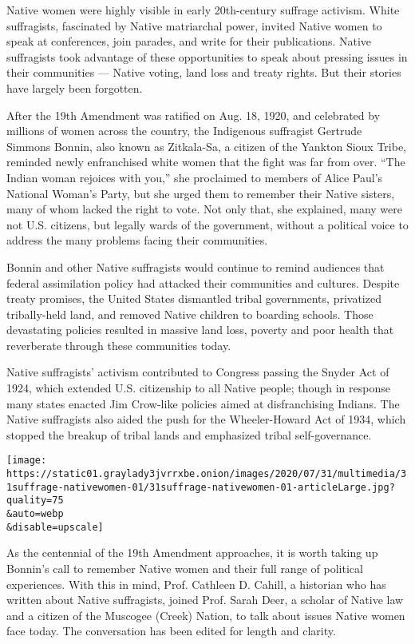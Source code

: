 Native women were highly visible in early 20th-century suffrage
activism. White suffragists, fascinated by Native matriarchal power,
invited Native women to speak at conferences, join parades, and write
for their publications. Native suffragists took advantage of these
opportunities to speak about pressing issues in their communities ---
Native voting, land loss and treaty rights. But their stories have
largely been forgotten.

After the 19th Amendment was ratified on Aug. 18, 1920, and celebrated
by millions of women across the country, the Indigenous suffragist
Gertrude Simmons Bonnin, also known as Zitkala-Sa, a citizen of the
Yankton Sioux Tribe, reminded newly enfranchised white women that the
fight was far from over. ``The Indian woman rejoices with you,'' she
proclaimed to members of Alice Paul's National Woman's Party, but she
urged them to remember their Native sisters, many of whom lacked the
right to vote. Not only that, she explained, many were not U.S.
citizens, but legally wards of the government, without a political voice
to address the many problems facing their communities.

Bonnin and other Native suffragists would continue to remind audiences
that federal assimilation policy had attacked their communities and
cultures. Despite treaty promises, the United States dismantled tribal
governments, privatized tribally-held land, and removed Native children
to boarding schools. Those devastating policies resulted in massive land
loss, poverty and poor health that reverberate through these communities
today.

Native suffragists' activism contributed to Congress passing the Snyder
Act of 1924, which extended U.S. citizenship to all Native people;
though in response many states enacted Jim Crow-like policies aimed at
disfranchising Indians. The Native suffragists also aided the push for
the Wheeler-Howard Act of 1934, which stopped the breakup of tribal
lands and emphasized tribal self-governance.

\texttt{[image: https://static01.graylady3jvrrxbe.onion/images/2020/07/31/multimedia/31suffrage-nativewomen-01/31suffrage-nativewomen-01-articleLarge.jpg?quality=75\\\&auto=webp\\\&disable=upscale]}

As the centennial of the 19th Amendment approaches, it is worth taking
up Bonnin's call to remember Native women and their full range of
political experiences. With this in mind, Prof. Cathleen D. Cahill, a
historian who has written about Native suffragists, joined Prof. Sarah
Deer, a scholar of Native law and a citizen of the Muscogee (Creek)
Nation, to talk about issues Native women face today. The conversation
has been edited for length and clarity.

